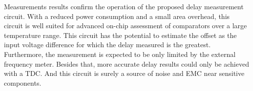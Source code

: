 Measurements results confirm the operation of the proposed delay measurement circuit. With a reduced power consumption and a small area overhead, this circuit is well suited for advanced on-chip assessment of comparators over a large temperature range. This circuit has the potential to estimate the offset as the input voltage difference for which the delay measured is the greatest. Furthermore, the measurement is expected to be only limited by the external frequency meter. Besides that, more accurate delay results could only be achieved with a TDC\@. And this circuit is surely a source of noise and EMC near sensitive components.